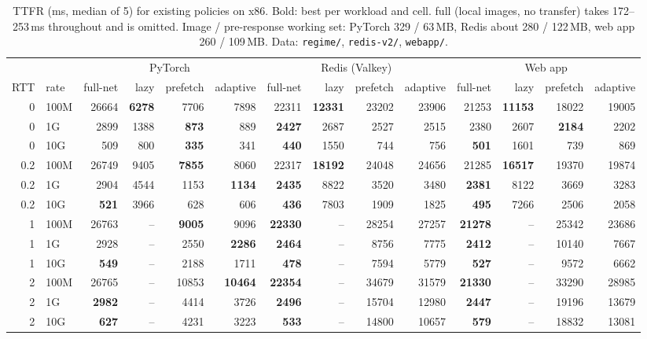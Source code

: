 \documentclass[conference]{IEEEtran}
\newcommand{\mode}[1]{\textsf{#1}}
\begin{document}
\begin{table}[t]
\centering
\caption{TTFR (ms, median of 5) for existing policies on x86. Bold: best per
workload and cell. \mode{full} (local images, no transfer) takes
172--253\,ms throughout and is omitted. Image / pre-response working set:
PyTorch 329 / 63\,MB, Redis about 280 / 122\,MB, web app 260 / 109\,MB.
{Data: \texttt{regime/}, \texttt{redis-v2/}, \texttt{webapp/}.}}
\label{tab:map}
\setlength{\tabcolsep}{4pt}
\begin{tabular}{@{}rl|rrrr|rrrr|rrrr@{}}
\toprule
 & & \multicolumn{4}{c|}{PyTorch} & \multicolumn{4}{c|}{Redis (Valkey)}
   & \multicolumn{4}{c}{Web app} \\
RTT & rate & full-net & lazy & prefetch & adaptive
           & full-net & lazy & prefetch & adaptive
           & full-net & lazy & prefetch & adaptive \\
\midrule
0   & 100M & 26664 & \textbf{6278} & 7706 & 7898 & 22311 & \textbf{12331} & 23202 & 23906 & 21253 & \textbf{11153} & 18022 & 19005 \\
0   & 1G   & 2899 & 1388 & \textbf{873} & 889 & \textbf{2427} & 2687 & 2527 & 2515 & 2380 & 2607 & \textbf{2184} & 2202 \\
0   & 10G  & 509 & 800 & \textbf{335} & 341 & \textbf{440} & 1550 & 744 & 756 & \textbf{501} & 1601 & 739 & 869 \\
0.2 & 100M & 26749 & 9405 & \textbf{7855} & 8060 & 22317 & \textbf{18192} & 24048 & 24656 & 21285 & \textbf{16517} & 19370 & 19874 \\
0.2 & 1G   & 2904 & 4544 & 1153 & \textbf{1134} & \textbf{2435} & 8822 & 3520 & 3480 & \textbf{2381} & 8122 & 3669 & 3283 \\
0.2 & 10G  & \textbf{521} & 3966 & 628 & 606 & \textbf{436} & 7803 & 1909 & 1825 & \textbf{495} & 7266 & 2506 & 2058 \\
1   & 100M & 26763 & -- & \textbf{9005} & 9096 & \textbf{22330} & -- & 28254 & 27257 & \textbf{21278} & -- & 25342 & 23686 \\
1   & 1G   & 2928 & -- & 2550 & \textbf{2286} & \textbf{2464} & -- & 8756 & 7775 & \textbf{2412} & -- & 10140 & 7667 \\
1   & 10G  & \textbf{549} & -- & 2188 & 1711 & \textbf{478} & -- & 7594 & 5779 & \textbf{527} & -- & 9572 & 6662 \\
2   & 100M & 26765 & -- & 10853 & \textbf{10464} & \textbf{22354} & -- & 34679 & 31579 & \textbf{21330} & -- & 33290 & 28985 \\
2   & 1G   & \textbf{2982} & -- & 4414 & 3726 & \textbf{2496} & -- & 15704 & 12980 & \textbf{2447} & -- & 19196 & 13679 \\
2   & 10G  & \textbf{627} & -- & 4231 & 3223 & \textbf{533} & -- & 14800 & 10657 & \textbf{579} & -- & 18832 & 13081 \\
\bottomrule
\end{tabular}
\end{table}
\end{document}
